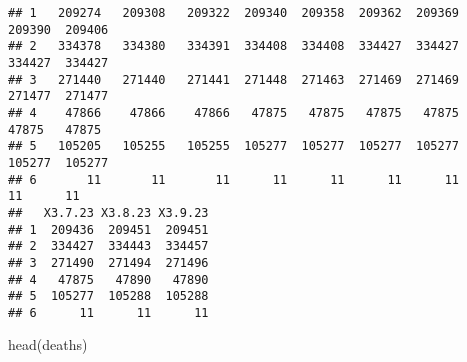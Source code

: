 \documentclass[
]{article}
\newenvironment{Shaded}{\begin{snugshade}}{\end{snugshade}}
\newcommand{\FunctionTok}[1]{\textcolor[rgb]{0.00,0.00,0.00}{#1}}
\newcommand{\NormalTok}[1]{#1}
\begin{document}
\begin{verbatim}
## 1   209274   209308   209322  209340  209358  209362  209369  209390  209406
## 2   334378   334380   334391  334408  334408  334427  334427  334427  334427
## 3   271440   271440   271441  271448  271463  271469  271469  271477  271477
## 4    47866    47866    47866   47875   47875   47875   47875   47875   47875
## 5   105205   105255   105255  105277  105277  105277  105277  105277  105277
## 6       11       11       11      11      11      11      11      11      11
##   X3.7.23 X3.8.23 X3.9.23
## 1  209436  209451  209451
## 2  334427  334443  334457
## 3  271490  271494  271496
## 4   47875   47890   47890
## 5  105277  105288  105288
## 6      11      11      11
\end{verbatim}

\begin{Shaded}
\begin{Highlighting}[]
\FunctionTok{head}\NormalTok{(deaths)}
\end{Highlighting}
\end{Shaded}
\end{document}
